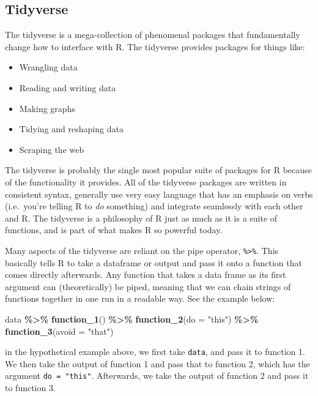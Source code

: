 \documentclass[
]{book}
\newenvironment{Shaded}{\begin{snugshade}}{\end{snugshade}}
\newcommand{\AttributeTok}[1]{\textcolor[rgb]{0.13,0.29,0.53}{#1}}
\newcommand{\FunctionTok}[1]{\textcolor[rgb]{0.13,0.29,0.53}{\textbf{#1}}}
\newcommand{\NormalTok}[1]{#1}
\newcommand{\SpecialCharTok}[1]{\textcolor[rgb]{0.81,0.36,0.00}{\textbf{#1}}}
\newcommand{\StringTok}[1]{\textcolor[rgb]{0.31,0.60,0.02}{#1}}
\providecommand{\tightlist}{%
  \setlength{\itemsep}{0pt}\setlength{\parskip}{0pt}}
\begin{document}
\subsection{Tidyverse}\label{tidyverse}

The tidyverse is a mega-collection of phenomenal packages that fundamentally change how to interface with R. The tidyverse provides packages for things like:

\begin{itemize}
\tightlist
\item
  Wrangling data
\item
  Reading and writing data
\item
  Making graphs
\item
  Tidying and reshaping data
\item
  Scraping the web
\end{itemize}

The tidyverse is probably the single most popular suite of packages for R because of the functionality it provides. All of the tidyverse packages are written in consistent syntax, generally use very easy language that has an emphasis on verbs (i.e.~you're telling R to \emph{do} something) and integrate seamlessly with each other and R. The tidyverse is a philosophy of R just as much as it is a suite of functions, and is part of what makes R so powerful today.

Many aspects of the tidyverse are reliant on the pipe operator, \texttt{\%\textgreater{}\%}. This basically tells R to take a dataframe or output and pass it onto a function that comes directly afterwards. Any function that takes a data frame as its first argument can (theoretically) be piped, meaning that we can chain strings of functions together in one run in a readable way. See the example below:

\begin{Shaded}
\begin{Highlighting}[]
\NormalTok{data }\SpecialCharTok{\%\textgreater{}\%}
  \FunctionTok{function\_1}\NormalTok{() }\SpecialCharTok{\%\textgreater{}\%}
  \FunctionTok{function\_2}\NormalTok{(}\AttributeTok{do =} \StringTok{"this"}\NormalTok{) }\SpecialCharTok{\%\textgreater{}\%}
  \FunctionTok{function\_3}\NormalTok{(}\AttributeTok{avoid =} \StringTok{"that"}\NormalTok{)}
\end{Highlighting}
\end{Shaded}

in the hypothetical example above, we first take \texttt{data}, and pass it to function 1. We then take the output of function 1 and pass that to function 2, which has the argument \texttt{do\ =\ "this"}. Afterwards, we take the output of function 2 and pass it to function 3.
\end{document}
